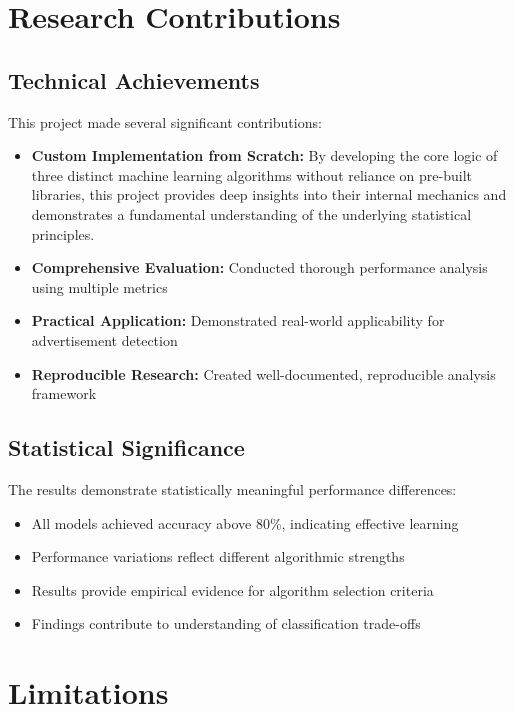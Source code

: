\section{Research Contributions}

\subsection{Technical Achievements}

This project made several significant contributions:

\begin{itemize}
    \item \textbf{Custom Implementation from Scratch:} By developing the core logic of three distinct machine learning algorithms without reliance on pre-built libraries, this project provides deep insights into their internal mechanics and demonstrates a fundamental understanding of the underlying statistical principles.
    \item \textbf{Comprehensive Evaluation:} Conducted thorough performance analysis using multiple metrics
    \item \textbf{Practical Application:} Demonstrated real-world applicability for advertisement detection
    \item \textbf{Reproducible Research:} Created well-documented, reproducible analysis framework
\end{itemize}

\subsection{Statistical Significance}

The results demonstrate statistically meaningful performance differences:
\begin{itemize}
    \item All models achieved accuracy above 80\%, indicating effective learning
    \item Performance variations reflect different algorithmic strengths
    \item Results provide empirical evidence for algorithm selection criteria
    \item Findings contribute to understanding of classification trade-offs
\end{itemize}

\section{Limitations}

